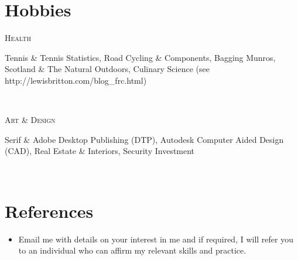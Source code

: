 \documentclass[a4, 10pt]{article}
\begin{document}
{%
\section{Hobbies}

\begin{minipage}[t]{.15\linewidth}
        \hfill                  
        \textsc{Health}    
\end{minipage}
\hfill\vline\hfill
\begin{minipage}[t]{.80\linewidth}
	Tennis \& Tennis Statistics, Road Cycling \& Components, Bagging Munros, Scotland \& The Natural Outdoors, Culinary Science (see http://lewisbritton.com/blog\_frc.html)
\end{minipage}\\

\begin{minipage}[t]{.15\linewidth}
        \hfill                  
	\textsc{Art \& Design}      
\end{minipage}
\hfill\vline\hfill
\begin{minipage}[t]{.80\linewidth}
	Serif \& Adobe Desktop Publishing (DTP), Autodesk Computer Aided Design (CAD), Real Estate \& Interiors, Security Investment
\end{minipage}\\


\section{References}

\begin{itemize}
\setlength\itemsep{0cm}
        \item Email me with details on your interest in me and if required, I will refer you to an individual who can affirm my relevant skills and practice.
\end{itemize}

}
\end{document}
